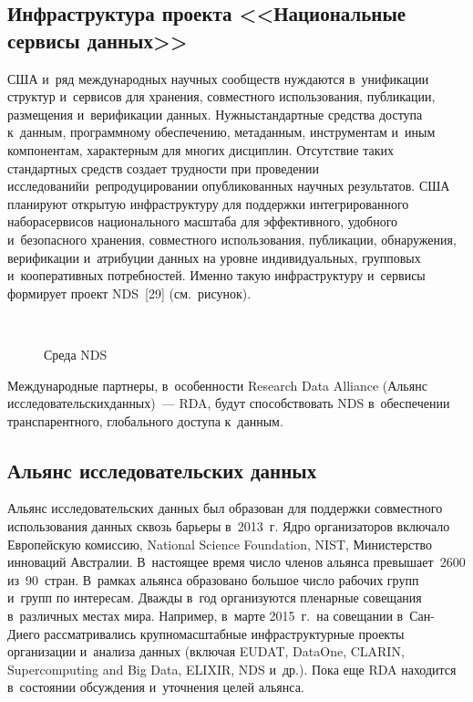 \begin{multicols}{2}
{}

\subsection{Инфраструктура проекта <<Национальные сервисы  данных>>}

  США и~ряд международных научных сообществ нуждаются в~унификации структур 
и~сервисов для хранения, совместного использования, публикации, размещения 
и~верификации данных. Нужны\linebreak стандартные средства доступа к~данным, програм\-мному 
обеспечению, метаданным, инструментам и~иным компонентам, характерным для многих 
дисциплин. Отсутствие таких стандартных средств создает трудности при проведении 
исследований\linebreak и~репродуцировании опубликованных научных результатов. США 
планируют открытую инфраструктуру для поддержки интегрированного набора\linebreak сервисов 
национального масштаба для эффективного, удобного и~безопасного хранения, 
совмест\-ного использования, пуб\-ли\-ка\-ции, обнаружения, верификации и~атрибуции данных 
на уровне индивидуальных, групповых и~кооперативных потребностей. Именно такую 
инфраструктуру и~сервисы формирует проект NDS~[29] (см.\ рисунок).

\begin{figure*}
\vspace*{1pt}
 \begin{center}
 \mbox{%
 \epsfxsize=132.238mm
 }

 
 
{\small Среда NDS}
 \end{center}
 \vspace*{6pt}
\end{figure*}

  Международные партнеры, в~особенности Research Data Alliance (Альянс 
исследовательских\linebreak данных)~--- RDA, будут способствовать NDS в~обеспечении 
транспарентного, глобального доступа к~данным.
  
\subsection{Альянс исследовательских данных}

Альянс исследовательских данных был образован для поддержки совместного использования данных сквозь барьеры 
в~2013~г. Ядро организаторов включало Европейскую комиссию, National
Science Foundation, NIST, Министерство инноваций Австралии. В~настоящее время 
число членов альянса превышает~2600 из~90~стран. В~рамках альянса образовано 
большое число рабочих групп и~групп по интересам. Дважды в~год организуются 
пленарные совещания в~различных местах мира. Например, в~марте 2015~г.\ на совещании 
в~Сан-Дие\-го рас\-смат\-ри\-ва\-лись крупномасштабные инфраструктурные проекты 
организации и~анализа данных (включая EUDAT, DataOne, CLARIN, Supercomputing and 
Big Data, ELIXIR, NDS и~др.). Пока еще RDA находится в~состоянии обсуждения 
и~уточнения целей альянса.


\end{multicols}
